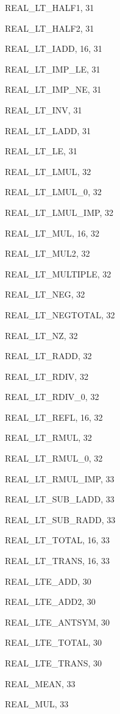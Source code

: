 \begin{theindex}
  \item {\ptt REAL\_LT\_HALF1}, 31
  \item {\ptt REAL\_LT\_HALF2}, 31
  \item {\ptt REAL\_LT\_IADD}, 16, 31
  \item {\ptt REAL\_LT\_IMP\_LE}, 31
  \item {\ptt REAL\_LT\_IMP\_NE}, 31
  \item {\ptt REAL\_LT\_INV}, 31
  \item {\ptt REAL\_LT\_LADD}, 31
  \item {\ptt REAL\_LT\_LE}, 31
  \item {\ptt REAL\_LT\_LMUL}, 32
  \item {\ptt REAL\_LT\_LMUL\_0}, 32
  \item {\ptt REAL\_LT\_LMUL\_IMP}, 32
  \item {\ptt REAL\_LT\_MUL}, 16, 32
  \item {\ptt REAL\_LT\_MUL2}, 32
  \item {\ptt REAL\_LT\_MULTIPLE}, 32
  \item {\ptt REAL\_LT\_NEG}, 32
  \item {\ptt REAL\_LT\_NEGTOTAL}, 32
  \item {\ptt REAL\_LT\_NZ}, 32
  \item {\ptt REAL\_LT\_RADD}, 32
  \item {\ptt REAL\_LT\_RDIV}, 32
  \item {\ptt REAL\_LT\_RDIV\_0}, 32
  \item {\ptt REAL\_LT\_REFL}, 16, 32
  \item {\ptt REAL\_LT\_RMUL}, 32
  \item {\ptt REAL\_LT\_RMUL\_0}, 32
  \item {\ptt REAL\_LT\_RMUL\_IMP}, 33
  \item {\ptt REAL\_LT\_SUB\_LADD}, 33
  \item {\ptt REAL\_LT\_SUB\_RADD}, 33
  \item {\ptt REAL\_LT\_TOTAL}, 16, 33
  \item {\ptt REAL\_LT\_TRANS}, 16, 33
  \item {\ptt REAL\_LTE\_ADD}, 30
  \item {\ptt REAL\_LTE\_ADD2}, 30
  \item {\ptt REAL\_LTE\_ANTSYM}, 30
  \item {\ptt REAL\_LTE\_TOTAL}, 30
  \item {\ptt REAL\_LTE\_TRANS}, 30
  \item {\ptt REAL\_MEAN}, 33
  \item {\ptt REAL\_MUL}, 33

\end{theindex}
